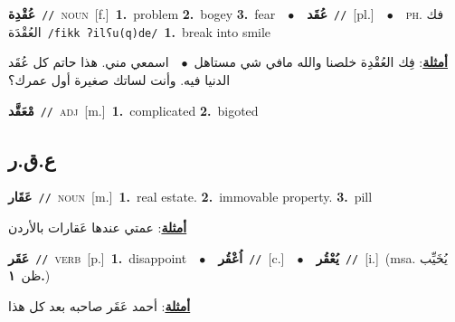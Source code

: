 \documentclass[10pt,a4paper,twoside]{article} %
\begin{document}
\begin{multicols}{2}
{\setlength\topsep{0pt}\textbf{\foreignlanguage{arabic}{عُقْدِة}}\ {\color{gray}\texttt{//}\color{black}}\ \textsc{noun}\ [f.]\ \textbf{1.}~problem  \textbf{2.}~bogey  \textbf{3.}~fear\ \ $\bullet$\ \ \setlength\topsep{0pt}\textbf{\foreignlanguage{arabic}{عُقَد}}\ {\color{gray}\texttt{//}\color{black}}\ [pl.]\ \ $\bullet$\ \ \textsc{ph.} \color{gray} \foreignlanguage{arabic}{فك العُقْدَة}\color{black}\ {\color{gray}\texttt{/{\sffamily fikk ʔilʕu(q)de}/}\color{black}}\ \textbf{1.}~break into smile\  \begin{flushright}\color{gray}\foreignlanguage{arabic}{\textbf{\underline{\foreignlanguage{arabic}{أمثلة}}}: فِك العُقْدِة خلصنا والله مافي شي مستاهل\ $\bullet$\ \  اسمعي مني. هذا حاتم كل عُقَد الدنيا فيه. وأنت لساتك صغيرة أول عمرك؟}\end{flushright}\color{black}} \vspace{2mm}

{\setlength\topsep{0pt}\textbf{\foreignlanguage{arabic}{مْعَقَّد}}\ {\color{gray}\texttt{//}\color{black}}\ \textsc{adj}\ [m.]\ \textbf{1.}~complicated  \textbf{2.}~bigoted\ } \vspace{2mm}

\vspace{-3mm}
\subsection*{\color{blue}\foreignlanguage{arabic}{ع.ق.ر}\color{blue}{}} 

{\setlength\topsep{0pt}\textbf{\foreignlanguage{arabic}{عَقَار}}\ {\color{gray}\texttt{//}\color{black}}\ \textsc{noun}\ [m.]\ \textbf{1.}~real estate.  \textbf{2.}~immovable property.  \textbf{3.}~pill\  \begin{flushright}\color{gray}\foreignlanguage{arabic}{\textbf{\underline{\foreignlanguage{arabic}{أمثلة}}}: عمتي عندها عَقارات بالأردن}\end{flushright}\color{black}} \vspace{2mm}

{\setlength\topsep{0pt}\textbf{\foreignlanguage{arabic}{عَقَر}}\ {\color{gray}\texttt{//}\color{black}}\ \textsc{verb}\ [p.]\ \textbf{1.}~disappoint\ \ $\bullet$\ \ \setlength\topsep{0pt}\textbf{\foreignlanguage{arabic}{اُعْقُر}}\ {\color{gray}\texttt{//}\color{black}}\ [c.]\ \ $\bullet$\ \ \setlength\topsep{0pt}\textbf{\foreignlanguage{arabic}{يُعْقُر}}\ {\color{gray}\texttt{//}\color{black}}\ [i.]\ \color{gray}(msa. \foreignlanguage{arabic}{يُخَيِّب ظن}~\foreignlanguage{arabic}{\textbf{١.}})\color{black}\  \begin{flushright}\color{gray}\foreignlanguage{arabic}{\textbf{\underline{\foreignlanguage{arabic}{أمثلة}}}: أحمد عَقَر صاحبه بعد كل هذا}\end{flushright}\color{black}} \vspace{2mm}


\end{multicols}
\end{document}
